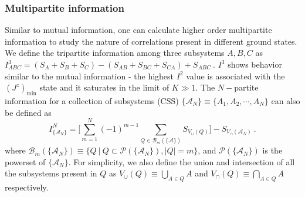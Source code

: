 \documentclass[reprint,prb,superscriptaddress]{revtex4-2}
\begin{document}
\subsubsection{Multipartite information}
Similar to mutual information, one can calculate higher order multipartite information to study the nature of correlations present in different ground states. We define the tripartite information among three subsystems $A,B,C$ as $I^3_{ABC} = (S_A+S_B+S_C)-(S_{AB}+S_{BC}+S_{CA})+S_{ABC}~$. \(I^3\) shows behavior similar to the mutual information - the highest \(I^2\) value is associated with the $\left(J^z\right)_\mathrm{min}$ state and it saturates in the limit of $K\gg 1$. The $N-$partite information for a collection of subsystems (CSS) $\{\mathcal{A}_N\}\equiv\{A_1,A_2,\cdots,A_N\}$ can also be defined 
as~\cite{siddharthatee} 
\begin{equation}
I^{N}_{\{\mathcal{A}_N\}} = \bigg[\displaystyle\sum_{m=1}^{N} (-1)^{m-1} \displaystyle\sum_{Q \in \mathcal{B}_m(\{\mathcal{A}\})} S_{V_{\cup}({Q})} \bigg]- S_{V_{\cap}(\mathcal{A}_N)}~.
\label{eq:I_N_definition}
\end{equation}
where  $\mathcal{B}_m(\{\mathcal{A}_N\})\equiv \{ Q~| ~Q\subset \mathcal{P}(\{\mathcal{A}_{N}\}), |Q|=m \}$, and $\mathcal{P}(\{\mathcal{A}_{N}\})$ is the powerset of $\{\mathcal{A}_N\}$. For simplicity, we also define the union and intersection of all the subsystems present in $Q$ as ${V}_{\cup}({Q})\equiv \bigcup_{A\in Q} A$ and ${V}_{\cap}({Q})\equiv \bigcap_{A\in Q} A$ respectively.
\end{document}
